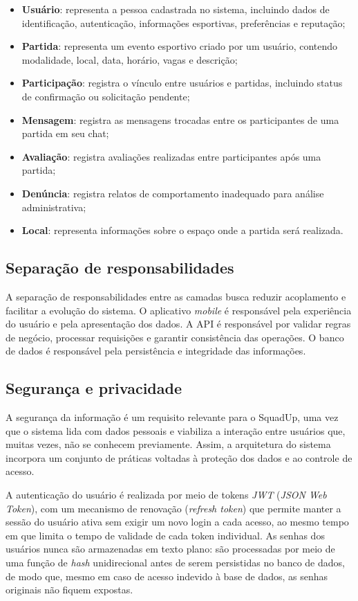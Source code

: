 \documentclass[a4paper, 12pt]{article}
\begin{document}
\begin{justify}
\begin{itemize}
    \item \textbf{Usuário}: representa a pessoa cadastrada no sistema, incluindo dados de identificação, autenticação, informações esportivas, preferências e reputação;
    \item \textbf{Partida}: representa um evento esportivo criado por um usuário, contendo modalidade, local, data, horário, vagas e descrição;
    \item \textbf{Participação}: registra o vínculo entre usuários e partidas, incluindo status de confirmação ou solicitação pendente;
    \item \textbf{Mensagem}: registra as mensagens trocadas entre os participantes de uma partida em seu chat;
    \item \textbf{Avaliação}: registra avaliações realizadas entre participantes após uma partida;
    \item \textbf{Denúncia}: registra relatos de comportamento inadequado para análise administrativa;
    \item \textbf{Local}: representa informações sobre o espaço onde a partida será realizada.
\end{itemize}

\subsection{Separação de responsabilidades}

A separação de responsabilidades entre as camadas busca reduzir acoplamento e facilitar a evolução do sistema. O aplicativo \textit{mobile} é responsável pela experiência do usuário e pela apresentação dos dados. A API é responsável por validar regras de negócio, processar requisições e garantir consistência das operações. O banco de dados é responsável pela persistência e integridade das informações.

\subsection{Segurança e privacidade}

A segurança da informação é um requisito relevante para o SquadUp, uma vez que o sistema lida com dados pessoais e viabiliza a interação entre usuários que, muitas vezes, não se conhecem previamente. Assim, a arquitetura do sistema incorpora um conjunto de práticas voltadas à proteção dos dados e ao controle de acesso.

A autenticação do usuário é realizada por meio de tokens \textit{JWT} (\textit{JSON Web Token}), com um mecanismo de renovação (\textit{refresh token}) que permite manter a sessão do usuário ativa sem exigir um novo login a cada acesso, ao mesmo tempo em que limita o tempo de validade de cada token individual. As senhas dos usuários nunca são armazenadas em texto plano: são processadas por meio de uma função de \textit{hash} unidirecional antes de serem persistidas no banco de dados, de modo que, mesmo em caso de acesso indevido à base de dados, as senhas originais não fiquem expostas.


\end{justify}
\end{document}
